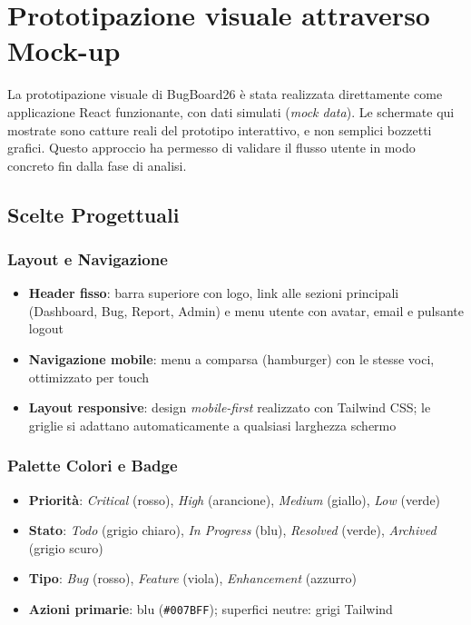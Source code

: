 
\section{Prototipazione visuale attraverso Mock-up}

La prototipazione visuale di BugBoard26 è stata realizzata direttamente come applicazione React funzionante, con dati simulati (\textit{mock data}). Le schermate qui mostrate sono catture reali del prototipo interattivo, e non semplici bozzetti grafici. Questo approccio ha permesso di validare il flusso utente in modo concreto fin dalla fase di analisi.

\subsection{Scelte Progettuali}

\subsubsection{Layout e Navigazione}
\begin{itemize}
    \item \textbf{Header fisso}: barra superiore con logo, link alle sezioni principali (Dashboard, Bug, Report, Admin) e menu utente con avatar, email e pulsante logout
    \item \textbf{Navigazione mobile}: menu a comparsa (hamburger) con le stesse voci, ottimizzato per touch
    \item \textbf{Layout responsive}: design \textit{mobile-first} realizzato con Tailwind CSS; le griglie si adattano automaticamente a qualsiasi larghezza schermo
\end{itemize}

\subsubsection{Palette Colori e Badge}
\begin{itemize}
    \item \textbf{Priorità}: \textit{Critical} (rosso), \textit{High} (arancione), \textit{Medium} (giallo), \textit{Low} (verde)
    \item \textbf{Stato}: \textit{Todo} (grigio chiaro), \textit{In Progress} (blu), \textit{Resolved} (verde), \textit{Archived} (grigio scuro)
    \item \textbf{Tipo}: \textit{Bug} (rosso), \textit{Feature} (viola), \textit{Enhancement} (azzurro)
    \item \textbf{Azioni primarie}: blu (\texttt{\#007BFF}); superfici neutre: grigi Tailwind
\end{itemize}

